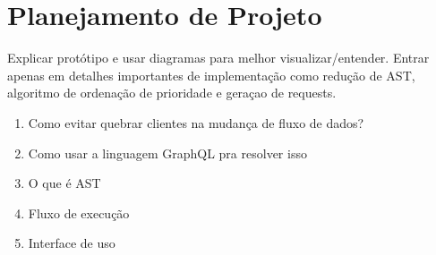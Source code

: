 \section{Planejamento de Projeto}

Explicar protótipo e usar diagramas para melhor visualizar/entender. Entrar apenas em detalhes importantes de implementação como redução de AST, algoritmo de ordenação de prioridade e geraçao de requests. 

\begin{enumerate}
\item Como evitar quebrar clientes na mudança de fluxo de dados?
\item Como usar a linguagem GraphQL pra resolver isso
\item O que é AST
\item Fluxo de execução
\item Interface de uso
\end{enumerate}
